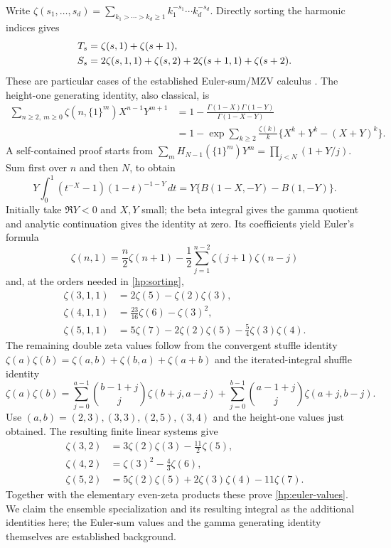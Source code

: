 Write
$\zeta(s_1,\ldots,s_d)=\sum_{k_1>\cdots>k_d\ge1}
k_1^{-s_1}\cdots k_d^{-s_d}$. Directly sorting the harmonic
indices gives
\begin{align}
 T_s&=\zeta(s,1)+\zeta(s+1),\notag\\
 S_s&=2\zeta(s,1,1)+\zeta(s,2)
                       +2\zeta(s+1,1)+\zeta(s+2).
 \label{hp:sorting}
\end{align}
These are particular cases of the established Euler-sum/MZV
calculus \cite{Xu2017,XuWang2019}. The height-one generating
identity, also classical, is
\begin{equation}\label{hp:height-one}
\begin{aligned}
 \sum_{n\ge2,\ m\ge0}\zeta(n,\{1\}^m)X^{n-1}Y^{m+1}
 &=1-\frac{\Gamma(1-X)\Gamma(1-Y)}{\Gamma(1-X-Y)}\\
 &=1-\exp\!\sum_{k\ge2}\frac{\zeta(k)}k
                   \{X^k+Y^k-(X+Y)^k\}.
\end{aligned}
\end{equation}
A self-contained proof starts from
$\sum_mH_{N-1}(\{1\}^m)Y^m=\prod_{j<N}(1+Y/j)$.
Sum first over $n$ and then $N$, to obtain
\[
 Y\int_0^1(t^{-X}-1)(1-t)^{-1-Y}\,dt
 =Y\{B(1-X,-Y)-B(1,-Y)\}.
\]
Initially take $\Re Y<0$ and $X,Y$ small; the beta integral
gives the gamma quotient and analytic continuation gives the
identity at zero. Its coefficients yield Euler's formula
\[
 \zeta(n,1)=\frac n2\zeta(n+1)
        -\frac12\sum_{j=1}^{n-2}\zeta(j+1)\zeta(n-j)
\]
and, at the orders needed in \eqref{hp:sorting},
\begin{align*}
 \zeta(3,1,1)&=2\zeta(5)-\zeta(2)\zeta(3),\\
 \zeta(4,1,1)&=\tfrac{23}{16}\zeta(6)-\zeta(3)^2,\\
 \zeta(5,1,1)&=5\zeta(7)-2\zeta(2)\zeta(5)
                                     -\tfrac54\zeta(3)\zeta(4).
\end{align*}
The remaining double zeta values follow from the convergent
stuffle identity
$\zeta(a)\zeta(b)=\zeta(a,b)+\zeta(b,a)+\zeta(a+b)$
and the iterated-integral shuffle identity
\[
 \zeta(a)\zeta(b)=
 \sum_{j=0}^{a-1}\binom{b-1+j}{j}\zeta(b+j,a-j)
 +\sum_{j=0}^{b-1}\binom{a-1+j}{j}\zeta(a+j,b-j).
\]
Use $(a,b)=(2,3),(3,3),(2,5),(3,4)$ and the height-one
values just obtained. The resulting finite linear systems give
\begin{align*}
 \zeta(3,2)&=3\zeta(2)\zeta(3)-\tfrac{11}{2}\zeta(5),\\
 \zeta(4,2)&=\zeta(3)^2-\tfrac43\zeta(6),\\
 \zeta(5,2)&=5\zeta(2)\zeta(5)+2\zeta(3)\zeta(4)-11\zeta(7).
\end{align*}
Together with the elementary even-zeta products these prove
\eqref{hp:euler-values}. We claim the ensemble specialization
and its resulting integral as the additional identities here;
the Euler-sum values and the gamma generating identity themselves
are established background.

